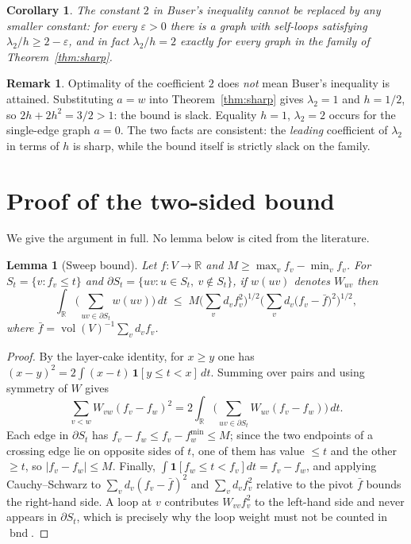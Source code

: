 \documentclass[11pt,a4paper]{article}
\theoremstyle{plain}
\newtheorem{lemma}[theorem]{Lemma}
\newtheorem{corollary}[theorem]{Corollary}
\theoremstyle{definition}
\newtheorem{remark}[theorem]{Remark}
\DeclareMathOperator{\vol}{vol}
\DeclareMathOperator{\bnd}{bnd}
\begin{document}
\begin{corollary}\label{cor:optimal}
The constant $2$ in Buser's inequality cannot be replaced by any smaller
constant: for every $\varepsilon>0$ there is a graph with self-loops satisfying
$\lambda_2/h\ge 2-\varepsilon$, and in fact $\lambda_2/h=2$ exactly for every
graph in the family of Theorem~\ref{thm:sharp}.
\end{corollary}

\begin{remark}\label{rem:nottight}
Optimality of the coefficient $2$ does \emph{not} mean Buser's inequality is
attained.  Substituting $a=w$ into Theorem~\ref{thm:sharp} gives
$\lambda_2=1$ and $h=1/2$, so $2h+2h^2=3/2>1$: the bound is slack.  Equality
$h=1$, $\lambda_2=2$ occurs for the single-edge graph $a=0$.  The two facts are
consistent: the \emph{leading} coefficient of $\lambda_2$ in terms of $h$ is
sharp, while the bound itself is strictly slack on the family.
\end{remark}

\section{Proof of the two-sided bound}\label{sec:proofs}

We give the argument in full.  No lemma below is cited from the literature.

\begin{lemma}[Sweep bound]\label{lem:sweep}
Let $f\colon V\to\mathbb{R}$ and $M\ge \max_v f_v-\min_v f_v$.  For
$S_t=\{v:f_v\le t\}$ and $\partial S_t=\{uv: u\in S_t,\ v\notin S_t\}$, if
$w(uv)$ denotes $W_{uv}$ then
\[
  \int_{\mathbb{R}} \Big(\sum_{uv\in\partial S_t} w(uv)\Big)\,dt
  \;\le\; M \Big(\sum_{v} d_v f_v^2\Big)^{1/2}
  \Big(\sum_{v} d_v\big(f_v-\bar f\big)^2\Big)^{1/2},
\]
where $\bar f=\vol(V)^{-1}\sum_v d_vf_v$.
\end{lemma}

\begin{proof}
By the layer-cake identity, for $x\ge y$ one has
$(x-y)^2=2\int (x-t)\,\mathbf 1[y\le t<x]\,dt$.  Summing over pairs and using
symmetry of $W$ gives
\[
 \sum_{v<w}W_{vw}(f_v-f_w)^2
 =2\int_{\mathbb{R}}\Big(\sum_{uv\in\partial S_t}W_{uv}(f_v-f_w)\Big)\,dt .
\]
Each edge in $\partial S_t$ has $f_v-f_w\le f_v-f_w^{\min}\le M$; since the
two endpoints of a crossing edge lie on opposite sides of $t$, one of them has
value $\le t$ and the other $\ge t$, so $|f_v-f_w|\le M$.  Finally,
$\int \mathbf 1[f_w\le t<f_v]dt=f_v-f_w$, and applying Cauchy--Schwarz to
$\sum_v d_v(f_v-\bar f)^2$ and $\sum_v d_vf_v^2$ relative to the pivot $\bar f$
bounds the right-hand side.  A loop at $v$ contributes $W_{vv}f_v^2$ to the
left-hand side and never appears in $\partial S_t$, which is precisely why the
loop weight must not be counted in $\bnd$.
\end{proof}
\end{document}
